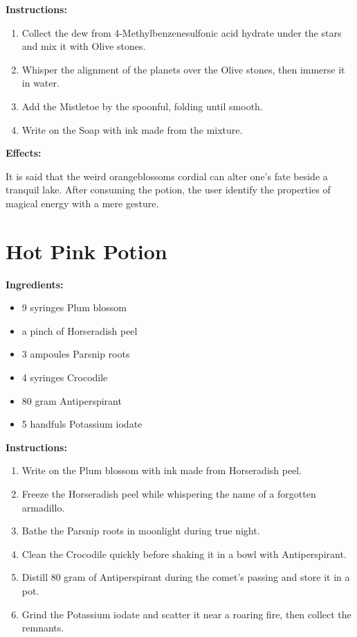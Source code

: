 \documentclass{article}
\begin{document}
\textbf{Instructions:}

\begin{enumerate}
  \item Collect the dew from 4-Methylbenzenesulfonic acid hydrate under the stars and mix it with Olive stones.
  \item Whisper the alignment of the planets over the Olive stones, then immerse it in water.
  \item Add the Mistletoe by the spoonful, folding until smooth.
  \item Write on the Soap with ink made from the mixture.
\end{enumerate}

\textbf{Effects:}

It is said that the weird orangeblossoms cordial can alter one's fate beside a tranquil lake. After consuming the potion, the user identify the properties of magical energy with a mere gesture.

\newpage
\section*{Hot Pink Potion}

\textbf{Ingredients:}

\begin{itemize}
  \item 9 syringes Plum blossom
  \item a pinch of Horseradish peel
  \item 3 ampoules Parsnip roots
  \item 4 syringes Crocodile
  \item 80 gram Antiperspirant
  \item 5 handfuls Potassium iodate
\end{itemize}

\textbf{Instructions:}

\begin{enumerate}
  \item Write on the Plum blossom with ink made from Horseradish peel.
  \item Freeze the Horseradish peel while whispering the name of a forgotten armadillo.
  \item Bathe the Parsnip roots in moonlight during true night.
  \item Clean the Crocodile quickly before shaking it in a bowl with Antiperspirant.
  \item Distill 80 gram of Antiperspirant during the comet’s passing and store it in a pot.
  \item Grind the Potassium iodate and scatter it near a roaring fire, then collect the remnants.
\end{enumerate}
\end{document}
